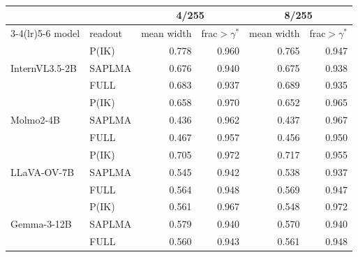 \vspace{6pt}
\\[2pt]
\footnotesize
\setlength{\tabcolsep}{6pt}
\begin{tabular}{@{}ll rrrr@{}}
\toprule
 &  & \multicolumn{2}{c}{4/255} & \multicolumn{2}{c}{8/255} \\
\cmidrule(lr){3-4}\cmidrule(lr){5-6}
model & readout & mean width & frac$>\gamma^{\ast}$ & mean width & frac$>\gamma^{\ast}$ \\
\midrule
\multirow{3}{*}{InternVL3.5-2B} & P(IK) & 0.778 & 0.960 & 0.765 & 0.947 \\
 & SAPLMA & 0.676 & 0.940 & 0.675 & 0.938 \\
 & FULL & 0.683 & 0.937 & 0.689 & 0.935 \\
\midrule
\multirow{3}{*}{Molmo2-4B} & P(IK) & 0.658 & 0.970 & 0.652 & 0.965 \\
 & SAPLMA & 0.436 & 0.962 & 0.437 & 0.967 \\
 & FULL & 0.467 & 0.957 & 0.456 & 0.950 \\
\midrule
\multirow{3}{*}{LLaVA-OV-7B} & P(IK) & 0.705 & 0.972 & 0.717 & 0.955 \\
 & SAPLMA & 0.545 & 0.942 & 0.538 & 0.937 \\
 & FULL & 0.564 & 0.948 & 0.569 & 0.947 \\
\midrule
\multirow{3}{*}{Gemma-3-12B} & P(IK) & 0.561 & 0.967 & 0.548 & 0.972 \\
 & SAPLMA & 0.579 & 0.940 & 0.570 & 0.940 \\
 & FULL & 0.560 & 0.943 & 0.561 & 0.948 \\
\bottomrule
\end{tabular}
